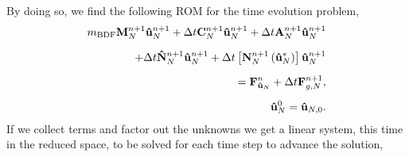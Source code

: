 \documentclass[../../thesis.tex]{subfiles}
\newcommand{\dt}{\ensuremath{\Delta t}}
\begin{document}
By doing so, we find the following ROM for the time evolution problem,
\begin{subequations}
    \label{eq:1d_rom_weak_formulation_discrete}
    \begin{align}
        m_{\text{BDF}} \vb{M}^{n+1}_{N} \vb{\hat{u}}_{N}^{n+1}
        + \dt \vb{C}^{n+1}_{N} \vb{\hat{u}}_{N}^{n+1}
        + \dt \vb{A}^{n+1}_{N} \vb{\hat{u}}_{N}^{n+1}
        \nonumber 
        \\[2mm]
        + \dt \vb{\hat{N}}^{n+1}_{N} \vb{\hat{u}}_{N}^{n+1}
        + \dt \left[\vb{N}^{n+1}_{N}\left(\vb{\hat{u}}_{N}^{*}\right)\right] \vb{\hat{u}}_{N}^{n+1}
        \nonumber
        \\[2mm]
        = \vb{F}_{\vb{\hat{u}}_{N}}^{n}
        + \dt \vb{F}_{g,N}^{n+1},
        \\[2mm]
        \vb{\hat{u}}_N^{0} = \vb{\hat{u}}_{N,0}.
    \end{align}
\end{subequations}
If we collect terms and factor out the unknowns we get a linear system, 
this time in the reduced space, to be solved for each time step to advance the solution,
\end{document}
